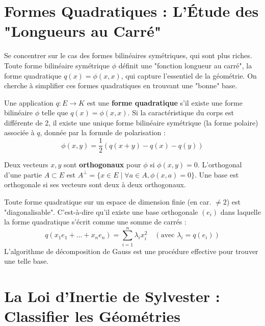 \section{Formes Quadratiques : L'Étude des "Longueurs au Carré"}

\begin{objectif}
    Se concentrer sur le cas des formes bilinéaires symétriques, qui sont plus riches. Toute forme bilinéaire symétrique $\phi$ définit une "fonction longueur au carré", la forme quadratique $q(x) = \phi(x,x)$, qui capture l'essentiel de la géométrie. On cherche à simplifier ces formes quadratiques en trouvant une "bonne" base.
\end{objectif}

\begin{definition}
    Une application $q: E \to K$ est une \textbf{forme quadratique} s'il existe une forme bilinéaire $\phi$ telle que $q(x)=\phi(x,x)$. Si la caractéristique du corps est différente de 2, il existe une unique forme bilinéaire symétrique (la forme polaire) associée à $q$, donnée par la formule de polarisation :
    $$ \phi(x,y) = \frac{1}{2} (q(x+y) - q(x) - q(y)) $$
\end{definition}

\begin{definition}[Orthogonalité]
    Deux vecteurs $x,y$ sont \textbf{orthogonaux} pour $\phi$ si $\phi(x,y)=0$. L'orthogonal d'une partie $A \subset E$ est $A^\perp = \{ x \in E \mid \forall a \in A, \phi(x,a)=0 \}$. Une base est orthogonale si ses vecteurs sont deux à deux orthogonaux.
\end{definition}

\begin{theorem}
    Toute forme quadratique sur un espace de dimension finie (en car. $\neq 2$) est "diagonalisable". C'est-à-dire qu'il existe une base orthogonale $(e_i)$ dans laquelle la forme quadratique s'écrit comme une somme de carrés :
    $$ q(x_1 e_1 + \dots + x_n e_n) = \sum_{i=1}^n \lambda_i x_i^2 \quad (\text{avec } \lambda_i = q(e_i)) $$
    L'algorithme de décomposition de Gauss est une procédure effective pour trouver une telle base.
\end{theorem}

\section{La Loi d'Inertie de Sylvester : Classifier les Géométries}


